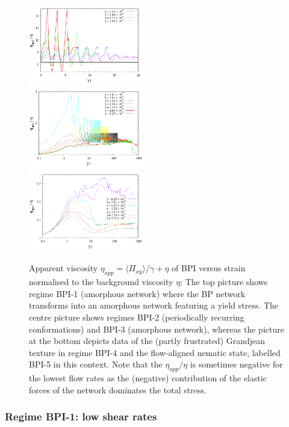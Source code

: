 \documentclass[8.5pt,twoside,twocolumn]{article}
\begin{document}
\begin{figure}[htpb]
\includegraphics[width=0.45\textwidth]{app_visc_strain_bp1_a.pdf}\\
\includegraphics[width=0.45\textwidth]{app_visc_strain_bp1_b.pdf}\\
\includegraphics[width=0.45\textwidth]{app_visc_strain_bp1_c.pdf}
\caption{
Apparent viscosity $\eta_{app}=\langle \Pi_{xy}\rangle/\dot{\gamma} + \eta$ of BPI versus strain normalised to the background viscosity $\eta$: 
The top picture shows regime BPI-1 (amorphous network) where
the BP network transforms into an amorphous network featuring a yield stress.
The centre picture shows regimes BPI-2 (periodically recurring conformations) and BPI-3 (amorphous network), 
whereas the picture at the bottom
depicts data of the (partly frustrated) Grandjean texture in regime BPI-4 
and the flow-aligned nematic state, labelled BPI-5 in this context. 
Note that the $\eta_{app}/\eta$ is sometimes negative for the lowest 
flow rates as the (negative) contribution of the elastic forces
of the network dominates the total stress.
}
\label{bp1-appvisc}
\end{figure}


\subsubsection{Regime BPI-1: low shear rates }
\end{document}
